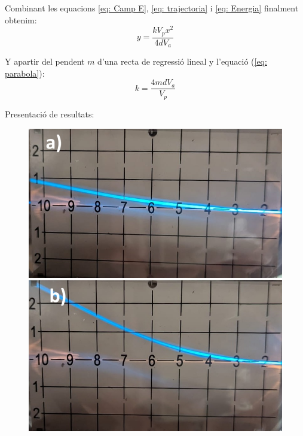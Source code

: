 \documentclass[11pt]{article}
\begin{document}
Combinant les equacions \ref{eq: Camp E}, \ref{eq: trajectoria} i \ref{eq: Energia} finalment obtenim:
\begin{equation}
    y = \frac{kV_px^2}{4dV_a}
    \label{eq: parabola}
\end{equation}

Y apartir del pendent $m$ d'una recta de regressió lineal y l'equació (\ref{eq: parabola}):
 \begin{equation}
      k =\frac{4mdV_a}{V_p}
      \label{eq: k}
 \end{equation}

Presentació de resultats:

\hfill
\begin{figure}[h]
    \centering
    \begin{minipage}{0.38\textwidth}
        \centering
        \includegraphics[width=\textwidth]{1kV.jpg}
    \end{minipage}
    \begin{minipage}{0.38\textwidth}
        \centering
        \includegraphics[width=\textwidth]{2kV.jpg}

\end{minipage}
\end{figure}
\end{document}
